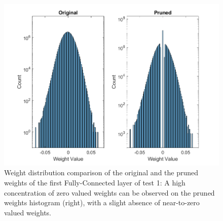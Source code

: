 \begin{figure} [H]
	\centering
	\includegraphics[width=\textwidth]{../Images/Weights-distributions/pruned/37.97/weight-distribution-FC1.png}
	\decoRule
	\caption[Weight distribution comparison of the original and the pruned weights of the first Fully-Connected layer of test 1]{Weight distribution comparison of the original and the pruned weights of the first Fully-Connected layer of test 1: A high concentration of zero valued weights can be observed on the pruned weights histogram (right), with a slight absence of near-to-zero valued weights.}
	\label{fig:weight-distribution-comparison-pruned-FC1-test1}
\end{figure}

